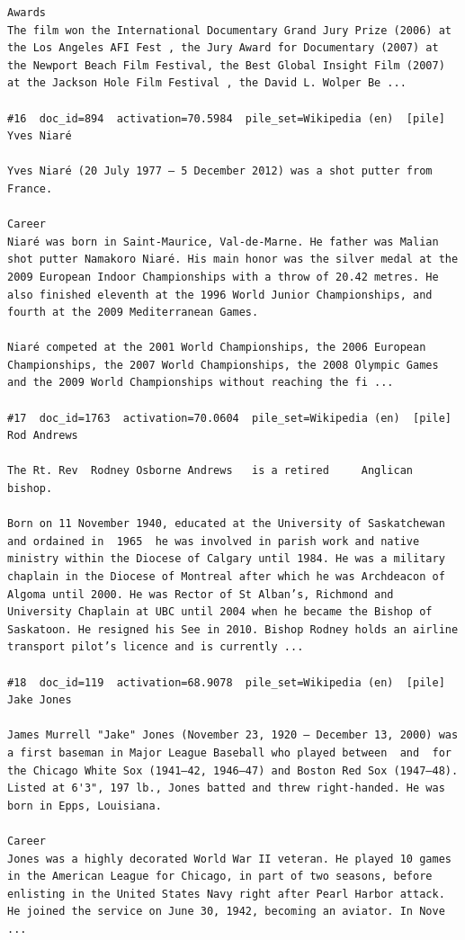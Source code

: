 \begin{verbatim}
Awards
The film won the International Documentary Grand Jury Prize (2006) at the Los Angeles AFI Fest , the Jury Award for Documentary (2007) at the Newport Beach Film Festival, the Best Global Insight Film (2007) at the Jackson Hole Film Festival , the David L. Wolper Be ...

#16  doc_id=894  activation=70.5984  pile_set=Wikipedia (en)  [pile]
Yves Niaré

Yves Niaré (20 July 1977 – 5 December 2012) was a shot putter from France.

Career
Niaré was born in Saint-Maurice, Val-de-Marne. He father was Malian shot putter Namakoro Niaré. His main honor was the silver medal at the 2009 European Indoor Championships with a throw of 20.42 metres. He also finished eleventh at the 1996 World Junior Championships, and fourth at the 2009 Mediterranean Games.

Niaré competed at the 2001 World Championships, the 2006 European Championships, the 2007 World Championships, the 2008 Olympic Games and the 2009 World Championships without reaching the fi ...

#17  doc_id=1763  activation=70.0604  pile_set=Wikipedia (en)  [pile]
Rod Andrews

The Rt. Rev  Rodney Osborne Andrews   is a retired     Anglican bishop.

Born on 11 November 1940, educated at the University of Saskatchewan and ordained in  1965  he was involved in parish work and native ministry within the Diocese of Calgary until 1984. He was a military chaplain in the Diocese of Montreal after which he was Archdeacon of Algoma until 2000. He was Rector of St Alban’s, Richmond and University Chaplain at UBC until 2004 when he became the Bishop of Saskatoon. He resigned his See in 2010. Bishop Rodney holds an airline transport pilot’s licence and is currently ...

#18  doc_id=119  activation=68.9078  pile_set=Wikipedia (en)  [pile]
Jake Jones

James Murrell "Jake" Jones (November 23, 1920 – December 13, 2000) was a first baseman in Major League Baseball who played between  and  for the Chicago White Sox (1941–42, 1946–47) and Boston Red Sox (1947–48). Listed at 6'3", 197 lb., Jones batted and threw right-handed. He was born in Epps, Louisiana.

Career
Jones was a highly decorated World War II veteran. He played 10 games in the American League for Chicago, in part of two seasons, before enlisting in the United States Navy right after Pearl Harbor attack. He joined the service on June 30, 1942, becoming an aviator. In Nove ...


\end{verbatim}
